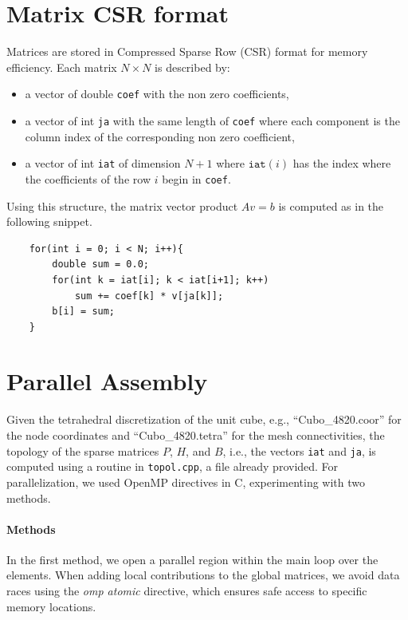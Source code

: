 \documentclass[hidelinks]{article}
\begin{document}
\section{Matrix CSR format}
Matrices are stored in Compressed Sparse Row (CSR) format for memory efficiency. Each matrix $N\times N$ is described by:
\begin{itemize}
    \item a vector of double \texttt{coef} with the non zero coefficients,
    \item a vector of int \texttt{ja} with the same length of \texttt{coef} where each component is the column index of the corresponding non zero coefficient,
    \item a vector of int \texttt{iat} of dimension $N+1$ where $\texttt{iat}(i)$ has the index where the coefficients of the row $i$ begin in \texttt{coef}.
\end{itemize}

Using this structure, the matrix vector product $A v = b$ is computed as in the following snippet.

\begin{lstlisting}
    for(int i = 0; i < N; i++){
        double sum = 0.0;
        for(int k = iat[i]; k < iat[i+1]; k++)
            sum += coef[k] * v[ja[k]];
        b[i] = sum;
    }
\end{lstlisting}

\section{Parallel Assembly}

Given the tetrahedral discretization of the unit cube, e.g., ``Cubo\_4820.coor'' for the node coordinates and ``Cubo\_4820.tetra'' for the mesh connectivities, the topology of the sparse matrices $P$, $H$, and $B$, i.e., the vectors \texttt{iat} and \texttt{ja}, is computed using a routine in \texttt{topol.cpp}, a file already provided.
For parallelization, we used OpenMP directives in C, experimenting with two methods.

\paragraph{Methods}

In the first method, we open a parallel region within the main loop over the elements. When adding local contributions to the global matrices, we avoid data races using the \emph{omp atomic} directive, which ensures safe access to specific memory locations.
\end{document}

